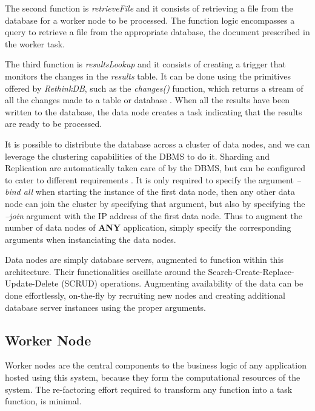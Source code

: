 \documentclass[12pt, titlepage]{uo_temp}
\begin{document}
     The second function is \emph{retrieveFile} and it consists of retrieving a file from
     the database for a worker node to be processed. The function logic encompasses a
     query to retrieve a file from the appropriate database, the document
     prescribed in the worker task.

     The third function is \emph{resultsLookup} and it consists of creating a trigger that
     monitors the changes in the \emph{results} table. It can be done using the
     primitives offered by \emph{RethinkDB}, such as the \emph{changes()} function, which
     returns a stream of all the changes made to a table or database
     \cite{rethinkdb}. When all the results have been written to the database, the data
     node creates a task indicating that the results are ready to be processed.

     It is possible to distribute the database across a cluster of data nodes, and we can
     leverage the clustering capabilities of the DBMS to do it. Sharding and Replication
     are automatically taken care of by the DBMS, but can be configured to cater to
     different requirements \cite{rethinkdb}. It is only required to specify the argument
     \emph{--bind all} when starting the instance of the first data node, then any other
     data node can join the cluster by specifying that argument, but also by specifying
     the \emph{--join} argument with the IP address of the first data node. Thus to
     augment the number of data nodes of \textbf{ANY} application, simply specify the
     corresponding arguments when instanciating the data nodes.

     Data nodes are simply database servers, augmented to function within this
     architecture. Their functionalities oscillate around the
     Search-Create-Replace-Update-Delete (SCRUD) operations. Augmenting availability of
     the data can be done effortlessly, on-the-fly by recruiting new nodes and creating
     additional database server instances using the proper arguments.

     \subsection{Worker Node}
     Worker nodes are the central components to the business logic of any application
     hosted using this system, because they form the computational resources of the
     system. The re-factoring effort required to transform any function into a task
     function, is minimal.
\end{document}
